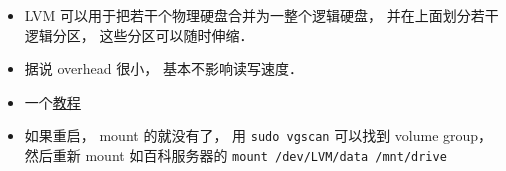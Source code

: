 
\begin{issues}
\issueDraft
\end{issues}

\begin{itemize}
\item LVM 可以用于把若干个物理硬盘合并为一整个逻辑硬盘， 并在上面划分若干逻辑分区， 这些分区可以随时伸缩．
\item 据说 overhead 很小， 基本不影响读写速度．
\item 一个\href{https://www.howtoforge.com/linux_lvm}{教程}
\item 如果重启， mount 的就没有了， 用 \verb`sudo vgscan` 可以找到 volume group， 然后重新 mount 如百科服务器的 \verb`mount /dev/LVM/data /mnt/drive`
\end{itemize}
